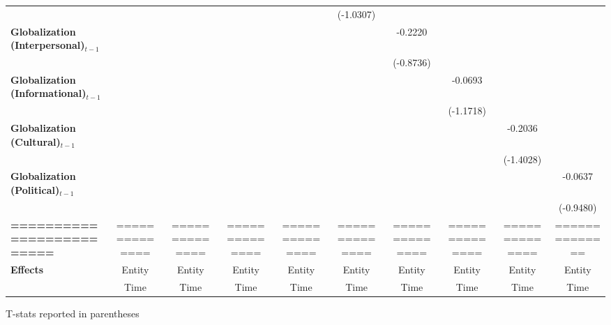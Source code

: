 \begin{center}
\begin{tabular}{lccccccccc}
\textbf{ }                         &                &                  &                  &                  &    (-1.0307)     &                  &                  &                  &                   \\
\textbf{Globalization (Interpersonal)$_{t-1}$}             &                &                  &                  &                  &                  &     -0.2220      &                  &                  &                   \\
\textbf{ }                         &                &                  &                  &                  &                  &    (-0.8736)     &                  &                  &                   \\
\textbf{Globalization (Informational)$_{t-1}$}             &                &                  &                  &                  &                  &                  &     -0.0693      &                  &                   \\
\textbf{ }                         &                &                  &                  &                  &                  &                  &    (-1.1718)     &                  &                   \\
\textbf{Globalization (Cultural)$_{t-1}$}             &                &                  &                  &                  &                  &                  &                  &     -0.2036      &                   \\
\textbf{ }                         &                &                  &                  &                  &                  &                  &                  &    (-1.4028)     &                   \\
\textbf{Globalization (Political)$_{t-1}$}             &                &                  &                  &                  &                  &                  &                  &                  &     -0.0637       \\
\textbf{ }                         &                &                  &                  &                  &                  &                  &                  &                  &    (-0.9480)      \\
\textbf{=========================} & ============== &  ==============  &  ==============  &  ==============  &  ==============  &  ==============  &  ==============  &  ==============  &  ==============   \\
\textbf{Effects}                   &     Entity     &      Entity      &      Entity      &      Entity      &      Entity      &      Entity      &      Entity      &      Entity      &      Entity       \\
\textbf{}                          &      Time      &       Time       &       Time       &       Time       &       Time       &       Time       &       Time       &       Time       &       Time        \\
\bottomrule
\end{tabular}
\end{center}

T-stats reported in parentheses